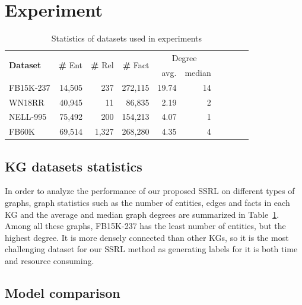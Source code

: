\documentclass[lettersize,journal]{IEEEtran}
\begin{document}
\section{Experiment}




\begin{table}[ht]
\centering
\caption{Statistics of datasets used in experiments
}
\begin{tabular}{lrrrrrrrrr}
\hline
\multirow{2}{4em}{\textbf{Dataset}} & \multirow{2}{4em}{\textbf\# Ent} & \multirow{2}{4em}{\textbf\# Rel}& \multirow{2}{4em}{\textbf\# Fact}& 

\multicolumn{2}{c}{Degree}\\
  & & & & avg.& median\\
\hline
FB15K-237 & 14,505 & 237 & 272,115  & 19.74 & 14 \\
WN18RR & 40,945 & 11 & 86,835  & 2.19 &2\\
NELL-995 &  75,492 & 200 & 154,213 & 4.07 &1 \\
FB60K &  69,514 & 1,327& 268,280  & 4.35 &4 \\
\hline
\end{tabular}

\label{dataset}
\end{table}


\subsection{KG datasets statistics }

\label{KG statistic}
In order to analyze the performance of our proposed SSRL on different types of graphs, graph statistics such as the number of entities, edges and facts in each KG and the average and median graph degrees are summarized in Table~\ref{dataset}. Among all these graphs, FB15K-237 has the least number of entities, but the highest degree. It is more densely connected than other KGs, so it is the most challenging dataset for our SSRL method as generating labels for it is both time and resource consuming. 

\subsection{Model comparison}
\end{document}
